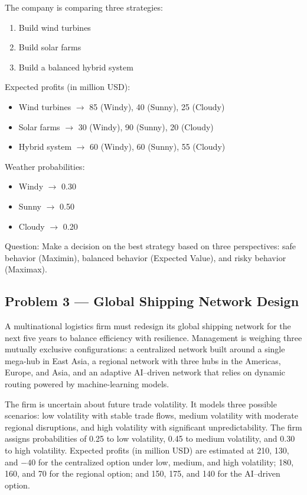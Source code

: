 The company is comparing three strategies:

\begin{enumerate}
	\item Build wind turbines
	\item Build solar farms
	\item Build a balanced hybrid system
\end{enumerate}

Expected profits (in million USD):

\begin{itemize}
	\item Wind turbines \(\rightarrow\) 85 (Windy), 40 (Sunny), 25 (Cloudy)
	\item Solar farms \(\rightarrow\) 30 (Windy), 90 (Sunny), 20 (Cloudy)
	\item Hybrid system \(\rightarrow\) 60 (Windy), 60 (Sunny), 55 (Cloudy)
\end{itemize}

Weather probabilities:

\begin{itemize}
	\item Windy \(\rightarrow\) 0.30
	\item Sunny \(\rightarrow\) 0.50
	\item Cloudy \(\rightarrow\) 0.20
\end{itemize}

Question: Make a decision on the best strategy based on three perspectives: safe behavior (Maximin), balanced behavior (Expected Value), and risky behavior (Maximax).

\subsection{Problem 3 --- Global Shipping Network Design}\label{subsec:practice-activity-1-problem-3}

A multinational logistics firm must redesign its global shipping network for the next five years to balance efficiency
with resilience. Management is weighing three mutually exclusive configurations: a centralized network built around a
single mega-hub in East Asia, a regional network with three hubs in the Americas, Europe, and Asia, and an adaptive
AI--driven network that relies on dynamic routing powered by machine-learning models.

The firm is uncertain about future trade volatility. It models three possible scenarios: low volatility with stable trade
flows, medium volatility with moderate regional disruptions, and high volatility with significant unpredictability. The
firm assigns probabilities of 0.25 to low volatility, 0.45 to medium volatility, and 0.30 to high volatility. Expected
profits (in million USD) are estimated at 210, 130, and $-40$ for the centralized option under low, medium, and high
volatility; 180, 160, and 70 for the regional option; and 150, 175, and 140 for the AI--driven option.


